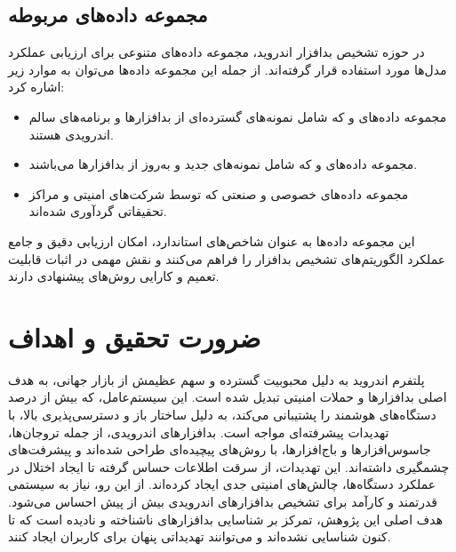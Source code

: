 \subsection{مجموعه داده‌های مربوطه}
در حوزه تشخیص بدافزار اندروید، مجموعه داده‌های متنوعی برای ارزیابی عملکرد مدل‌ها مورد استفاده قرار گرفته‌اند. از جمله این مجموعه داده‌ها می‌توان به موارد زیر اشاره کرد:
\begin{itemize}
    \renewcommand{\labelitemi}{\lr{$\bullet$}}
    \item مجموعه داده‌های  \cite{Drebin} و  \cite{AndroZoo} که شامل نمونه‌های گسترده‌ای از بدافزارها و برنامه‌های سالم اندرویدی هستند.
    \item مجموعه داده‌های  \cite{CICMalDroid} و  که شامل نمونه‌های جدید و به‌روز از بدافزارها می‌باشند.
    \item مجموعه داده‌های خصوصی و صنعتی که توسط شرکت‌های امنیتی و مراکز تحقیقاتی گردآوری شده‌اند.
\end{itemize}
این مجموعه داده‌ها به عنوان شاخص‌های استاندارد، امکان ارزیابی دقیق و جامع عملکرد الگوریتم‌های تشخیص بدافزار را فراهم می‌کنند و نقش مهمی در اثبات قابلیت تعمیم و کارایی روش‌های پیشنهادی دارند.

\section{ضرورت تحقیق و اهداف}\label{import}
پلتفرم اندروید به دلیل محبوبیت گسترده و سهم عظیمش از بازار جهانی، به هدف اصلی بدافزارها و حملات امنیتی تبدیل شده است. این سیستم‌عامل، که بیش از  درصد دستگاه‌های هوشمند را پشتیبانی می‌کند، به دلیل ساختار باز و دسترسی‌پذیری بالا، با تهدیدات پیشرفته‌ای مواجه است. بدافزارهای اندرویدی، از جمله تروجان‌ها، جاسوس‌افزارها و باج‌افزارها، با روش‌های پیچیده‌ای طراحی شده‌اند و پیشرفت‌های چشمگیری داشته‌اند. این تهدیدات، از سرقت اطلاعات حساس گرفته تا ایجاد اختلال در عملکرد دستگاه‌ها، چالش‌های امنیتی جدی ایجاد کرده‌اند. از این رو، نیاز به سیستمی قدرتمند و کارآمد برای تشخیص بدافزارهای اندرویدی بیش از پیش احساس می‌شود. هدف اصلی این پژوهش، تمرکز بر شناسایی بدافزارهای ناشناخته و نادیده  است که تا کنون شناسایی نشده‌اند و می‌توانند تهدیداتی پنهان برای کاربران ایجاد کنند.


